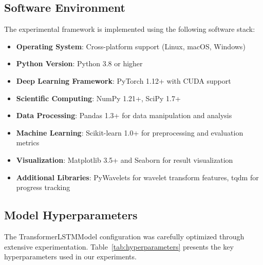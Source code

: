\subsection{Software Environment}
\label{subsec:software_environment}

The experimental framework is implemented using the following software stack:

\begin{itemize}
    \item \textbf{Operating System}: Cross-platform support (Linux, macOS, Windows)
    \item \textbf{Python Version}: Python 3.8 or higher
    \item \textbf{Deep Learning Framework}: PyTorch 1.12+ with CUDA support
    \item \textbf{Scientific Computing}: NumPy 1.21+, SciPy 1.7+
    \item \textbf{Data Processing}: Pandas 1.3+ for data manipulation and analysis
    \item \textbf{Machine Learning}: Scikit-learn 1.0+ for preprocessing and evaluation metrics
    \item \textbf{Visualization}: Matplotlib 3.5+ and Seaborn for result visualization
    \item \textbf{Additional Libraries}: PyWavelets for wavelet transform features, tqdm for progress tracking
\end{itemize}

\subsection{Model Hyperparameters}
\label{subsec:model_hyperparameters}

The TransformerLSTMModel configuration was carefully optimized through extensive experimentation. Table~\ref{tab:hyperparameters} presents the key hyperparameters used in our experiments.

